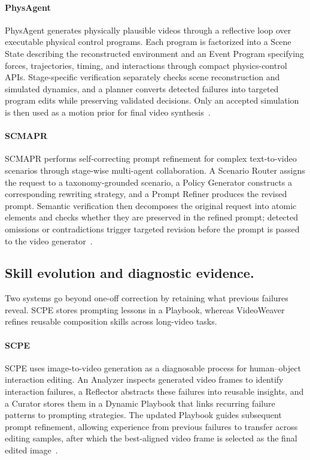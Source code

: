 \paragraph{PhysAgent}
PhysAgent generates physically plausible videos through a reflective loop over executable physical control programs. Each program is factorized into a Scene State describing the reconstructed environment and an Event Program specifying forces, trajectories, timing, and interactions through compact physics-control APIs. Stage-specific verification separately checks scene reconstruction and simulated dynamics, and a planner converts detected failures into targeted program edits while preserving validated decisions. Only an accepted simulation is then used as a motion prior for final video synthesis~\cite{li2026physagent}.

\paragraph{SCMAPR}
SCMAPR performs self-correcting prompt refinement for complex text-to-video scenarios through stage-wise multi-agent collaboration. A Scenario Router assigns the request to a taxonomy-grounded scenario, a Policy Generator constructs a corresponding rewriting strategy, and a Prompt Refiner produces the revised prompt. Semantic verification then decomposes the original request into atomic elements and checks whether they are preserved in the refined prompt; detected omissions or contradictions trigger targeted revision before the prompt is passed to the video generator~\cite{avg260405489}.

\subsection{Skill evolution and diagnostic evidence.}
Two systems go beyond one-off correction by retaining what previous failures reveal. SCPE stores prompting lessons in a Playbook, whereas VideoWeaver refines reusable composition skills across long-video tasks.

\paragraph{SCPE}
SCPE uses image-to-video generation as a diagnosable process for human--object interaction editing. An Analyzer inspects generated video frames to identify interaction failures, a Reflector abstracts these failures into reusable insights, and a Curator stores them in a Dynamic Playbook that links recurring failure patterns to prompting strategies. The updated Playbook guides subsequent prompt refinement, allowing experience from previous failures to transfer across editing samples, after which the best-aligned video frame is selected as the final edited image~\cite{avg260619073}.

